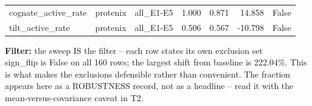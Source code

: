 \begin{table}[htbp]
\begin{tabular}{lrrrrrr}
cognate\_active\_rate & protenix & all\_E1-E5 & 1.000 & 0.871 & 14.858 & False \\
tilt\_active\_rate & protenix & all\_E1-E5 & 0.506 & 0.567 & -10.798 & False \\
\bottomrule
\end{tabular}
\begin{flushleft}\scriptsize
\textbf{Filter:} the sweep IS the filter -- each row states its own exclusion set
 \\ sign\_flip is False on all 160 rows; the largest shift from baseline is 222.04\%. This is what makes the exclusions defensible rather than convenient. The fraction appears here as a ROBUSTNESS record, not as a headline -- read it with the mean-versus-covariance caveat in T2.
\end{flushleft}
\end{table}
